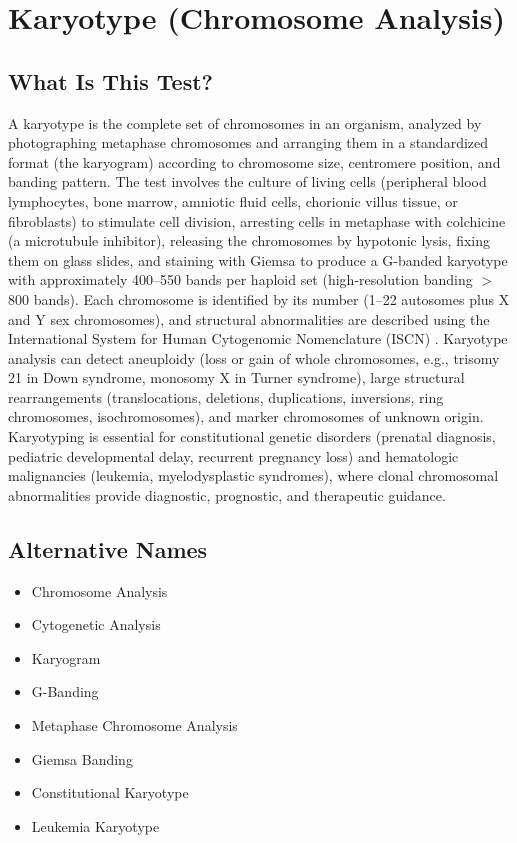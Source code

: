 \chapter{Karyotype (Chromosome Analysis)}

\section*{What Is This Test?}
A karyotype is the complete set of chromosomes in an organism, analyzed by photographing metaphase chromosomes and arranging them in a standardized format (the karyogram) according to chromosome size, centromere position, and banding pattern. The test involves the culture of living cells (peripheral blood lymphocytes, bone marrow, amniotic fluid cells, chorionic villus tissue, or fibroblasts) to stimulate cell division, arresting cells in metaphase with colchicine (a microtubule inhibitor), releasing the chromosomes by hypotonic lysis, fixing them on glass slides, and staining with Giemsa to produce a G-banded karyotype with approximately 400--550 bands per haploid set (high-resolution banding $>$800 bands). Each chromosome is identified by its number (1--22 autosomes plus X and Y sex chromosomes), and structural abnormalities are described using the International System for Human Cytogenomic Nomenclature (ISCN) \cite{mcgowanjordan2020iscn}. Karyotype analysis can detect aneuploidy (loss or gain of whole chromosomes, e.g., trisomy 21 in Down syndrome, monosomy X in Turner syndrome), large structural rearrangements (translocations, deletions, duplications, inversions, ring chromosomes, isochromosomes), and marker chromosomes of unknown origin. Karyotyping is essential for constitutional genetic disorders (prenatal diagnosis, pediatric developmental delay, recurrent pregnancy loss) and hematologic malignancies (leukemia, myelodysplastic syndromes), where clonal chromosomal abnormalities provide diagnostic, prognostic, and therapeutic guidance.

\section*{Alternative Names}
\begin{itemize}
  \item Chromosome Analysis
  \item Cytogenetic Analysis
  \item Karyogram
  \item G-Banding
  \item Metaphase Chromosome Analysis
  \item Giemsa Banding
  \item Constitutional Karyotype
  \item Leukemia Karyotype
\end{itemize}
